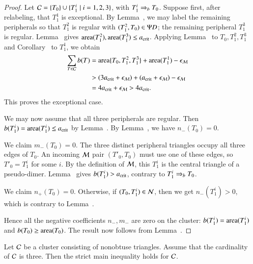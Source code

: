 \begin{proof}  
  Let $\mathcal C = \{T_0\}\cup \{T_1^i \mid i=1,2,3\}$, with
  $T_1^i\Rightarrow_{b} T_0$. Suppose first, after relabeling, that $T_1^1$ is
  exceptional. By Lemma~, we may label the remaining
  peripherals so that $T_1^2$ is regular with $(T_1^2,T_0)\in\Psi D$;
  the remaining peripheral $T_1^3$ is regular. Lemma~ gives
  ${\operatorname{area}}(T_1^2),{\operatorname{area}}(T_1^3)\le a_\text{crit}$. Applying
  Lemma~ to $T_0,T_1^2,T_1^3$ and
  Corollary~ to $T_1^1$, we obtain
  \begin{align*}
  \sum_{T\in\mathcal C}b(T)
  &={\operatorname{area}}\{T_0,T_1^2,T_1^3\}+{\operatorname{area}}(T_1^1)-\epsilon_{\mathcal M}\\
  &>(3a_\text{crit}+\epsilon_{\mathcal M})+(a_\text{crit}+\epsilon_{\mathcal M})-\epsilon_{\mathcal M}\\
  &=4a_\text{crit}+\epsilon_{\mathcal M}>4a_\text{crit}.
  \end{align*}
  This proves the exceptional case.

  We may now assume that all three peripherals are regular. Then
  $b(T_1^i)={\operatorname{area}}(T_1^i)\le a_\text{crit}$ by
  Lemma~. By
  Lemma~, we have
  $n_-(T_0)=0$.

  We claim $m_-(T_0)=0$.  The three distinct peripheral triangles
  occupy all three edges of $T_0$.  An incoming $\mathcal M$ pair
  $(T'_0,T_0)$ must use one of these edges, so $T'_0=T_1^i$ for some $i$.
  By the definition of $\mathcal M$, this $T_1^i$ is the central triangle
  of a pseudo-dimer.  Lemma~ gives
  $b(T_1^i)>a_\text{crit}$, contrary to $T_1^i\Rightarrow_{b} T_0$.

  We claim $n_+(T_0)=0$.  Otherwise, if $(T_0,T_1^i)\in\mathcal N$, then we
  get $n_-(T_1^i)>0$, which is contrary to Lemma~.

  Hence all the negative coefficients $n_-,m_-$ are zero on the cluster:
  $b(T_1^i)={\operatorname{area}}(T_1^i)$ and $b(T_0) \ge {\operatorname{area}}(T_0)$.  The result now
  follows from Lemma~.
\end{proof}

\begin{lemma}
  Let $\mathcal C$ be a cluster consisting of nonobtuse triangles.  Assume
  that the cardinality of $\mathcal C$ is three.  Then the strict main
  inequality holds for $\mathcal C$.
\end{lemma}

